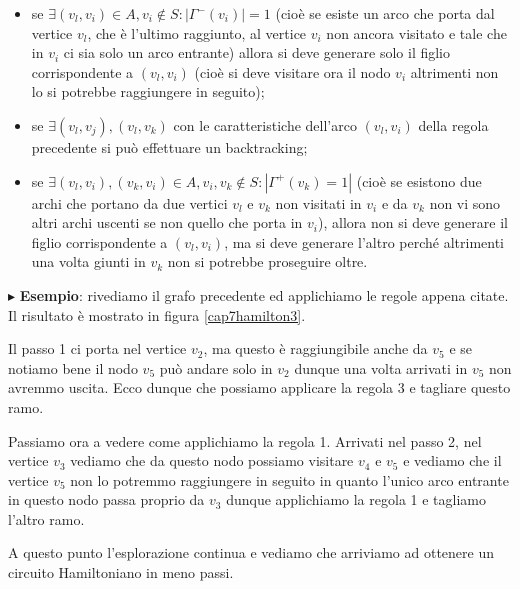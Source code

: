 \documentclass[11pt]{book}
\begin{document}
\begin{itemize}
\item se $\exists (v_l,v_i) \in A, v_i \not\in S: |\Gamma^-(v_i)| = 1$
  (cio\`e se esiste un arco che porta dal vertice $v_l$, che \`e
  l'ultimo raggiunto, al vertice $v_i$ non ancora visitato e tale che
  in $v_i$ ci sia solo un arco entrante) allora si deve generare solo
  il figlio corrispondente a $(v_l,v_i)$ (cio\`e si deve visitare ora
  il nodo $v_i$ altrimenti non lo si potrebbe raggiungere in seguito);

\item se $\exists (v_l, v_j), (v_l, v_k)$ con le caratteristiche
  dell'arco $(v_l,v_i)$ della regola precedente si pu\`o effettuare un
  backtracking;

\item se $\exists (v_l,v_i), (v_k,v_i) \in A, v_i, v_k \not\in S:
  |\Gamma^+(v_k) = 1|$ (cio\`e se esistono due archi che portano da
  due vertici $v_l$ e $v_k$ non visitati in $v_i$ e da $v_k$ non vi
  sono altri archi uscenti se non quello che porta in $v_i$), allora
  non si deve generare il figlio corrispondente a $(v_l,v_i)$, ma si
  deve generare l'altro perch\'e altrimenti una volta giunti in $v_k$
  non si potrebbe proseguire oltre.
\end{itemize}

\vspace{11pt}
$\blacktriangleright$ {\bf Esempio}: rivediamo il grafo precedente ed
applichiamo le regole appena citate. Il risultato \`e mostrato in
figura \ref{cap7hamilton3}.

Il passo 1 ci porta nel vertice $v_2$, ma questo \`e raggiungibile
anche da $v_5$ e se notiamo bene il nodo $v_5$ pu\`o andare solo in
$v_2$ dunque una volta arrivati in $v_5$ non avremmo uscita. Ecco
dunque che possiamo applicare la regola 3 e tagliare questo ramo.

Passiamo ora a vedere come applichiamo la regola 1. Arrivati nel passo
2, nel vertice $v_3$ vediamo che da questo nodo possiamo visitare
$v_4$ e $v_5$ e vediamo che il vertice $v_5$ non lo potremmo
raggiungere in seguito in quanto l'unico arco entrante in questo nodo
passa proprio da $v_3$ dunque applichiamo la regola 1 e tagliamo
l'altro ramo.

A questo punto l'esplorazione continua e vediamo che arriviamo ad
ottenere un circuito Hamiltoniano in meno passi.
\end{document}
